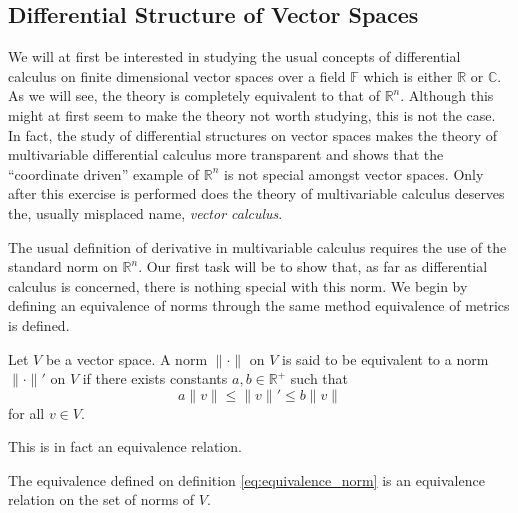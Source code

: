 \subsection{Differential Structure of Vector Spaces}

We will at first be interested in studying the usual concepts of differential calculus on finite dimensional vector spaces over a field $\mathbb{F}$ which is either $\mathbb{R}$ or $\mathbb{C}$. As we will see, the theory is completely equivalent to that of $\mathbb{R}^n$. Although this might at first seem to make the theory not worth studying, this is not the case. In fact, the study of differential structures on vector spaces makes the theory of multivariable differential calculus more transparent and shows that the ``coordinate driven'' example of $\mathbb{R}^n$ is not special amongst vector spaces. Only after this exercise is performed does the theory of multivariable calculus deserves the, usually misplaced name, \textit{vector calculus}.

The usual definition of derivative in multivariable calculus requires the use of the standard norm on $\mathbb{R}^n$. Our first task will be to show that, as far as differential calculus is concerned, there is nothing special with this norm. We begin by defining an equivalence of norms through the same method equivalence of metrics is defined.

\begin{definition}\label{eq:equivalence_norm}
	Let $V$ be a vector space. A norm $\|\cdot\|$ on $V$ is said to be equivalent to a norm $\|\cdot\|'$ on $V$ if there exists constants $a,b\in\mathbb{R}^+$ such that
	\begin{equation}
		a\|v\|\leq\|v\|'\leq b\|v\|
	\end{equation}
for all $v\in V$.
\end{definition}

This is in fact an equivalence relation. 

\begin{theorem}
	The equivalence defined on definition \ref{eq:equivalence_norm} is an equivalence relation on the set of norms of $V$.
\end{theorem}

